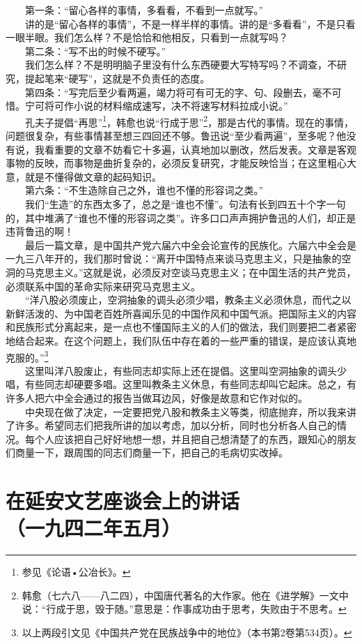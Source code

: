\documentclass[cn,11pt,chinese]{elegantbook}
\def\myformat#1{\hfil\hfil #1}
\begin{document}
　　第一条：“留心各样的事情，多看看，不看到一点就写。”\\
　　讲的是“留心各样的事情”，不是一样半样的事情。讲的是“多看看”，不是只看一眼半眼。我们怎么样？不是恰恰和他相反，只看到一点就写吗？\\
　　第二条：“写不出的时候不硬写。”\\
　　我们怎么样？不是明明脑子里没有什么东西硬要大写特写吗？不调查，不研究，提起笔来“硬写”，这就是不负责任的态度。\\
　　第四条：“写完后至少看两遍，竭力将可有可无的字、句、段删去，毫不可惜。宁可将可作小说的材料缩成速写，决不将速写材料拉成小说。”\\
　　孔夫子提倡“再思”\footnote[13]{ 参见《论语•公冶长》。}，韩愈也说“行成于思”\footnote[14]{ 韩愈（七六八——八二四），中国唐代著名的大作家。他在《进学解》一文中说：“行成于思，毁于随。”意思是：作事成功由于思考，失败由于不思考。}，那是古代的事情。现在的事情，问题很复杂，有些事情甚至想三四回还不够。鲁迅说“至少看两遍”，至多呢？他没有说，我看重要的文章不妨看它十多遍，认真地加以删改，然后发表。文章是客观事物的反映，而事物是曲折复杂的，必须反复研究，才能反映恰当；在这里粗心大意，就是不懂得做文章的起码知识。\\
　　第六条：“不生造除自己之外，谁也不懂的形容词之类。”\\
　　我们“生造”的东西太多了，总之是“谁也不懂”。句法有长到四五十个字一句的，其中堆满了“谁也不懂的形容词之类”。许多口口声声拥护鲁迅的人们，却正是违背鲁迅的啊！\\
　　最后一篇文章，是中国共产党六届六中全会论宣传的民族化。六届六中全会是一九三八年开的，我们那时曾说：“离开中国特点来谈马克思主义，只是抽象的空洞的马克思主义。”这就是说，必须反对空谈马克思主义；在中国生活的共产党员，必须联系中国的革命实际来研究马克思主义。\\
　　“洋八股必须废止，空洞抽象的调头必须少唱，教条主义必须休息，而代之以新鲜活泼的、为中国老百姓所喜闻乐见的中国作风和中国气派。把国际主义的内容和民族形式分离起来，是一点也不懂国际主义的人们的做法，我们则要把二者紧密地结合起来。在这个问题上，我们队伍中存在着的一些严重的错误，是应该认真地克服的。”\footnote[15]{ 以上两段引文见《中国共产党在民族战争中的地位》（本书第2卷第534页）。}\\
　　这里叫洋八股废止，有些同志却实际上还在提倡。这里叫空洞抽象的调头少唱，有些同志却硬要多唱。这里叫教条主义休息，有些同志却叫它起床。总之，有许多人把六中全会通过的报告当做耳边风，好像是故意和它作对似的。\\
　　中央现在做了决定，一定要把党八股和教条主义等类，彻底抛弃，所以我来讲了许多。希望同志们把我所讲的加以考虑，加以分析，同时也分析各人自己的情况。每个人应该把自己好好地想一想，并且把自己想清楚了的东西，跟知心的朋友们商量一下，跟周围的同志们商量一下，把自己的毛病切实改掉。\\
\newpage\section*{\myformat{在延安文艺座谈会上的讲话}\\\myformat{（一九四二年五月）}}
\end{document}
